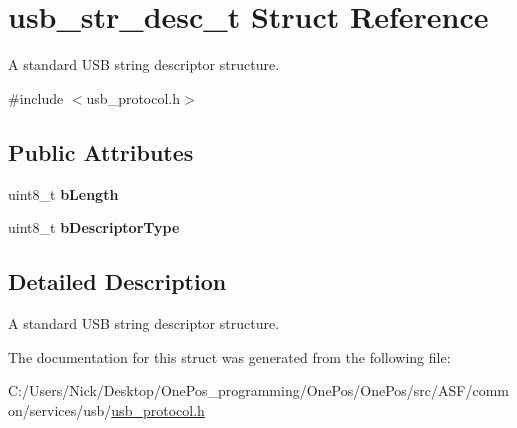 \hypertarget{structusb__str__desc__t}{\section{usb\-\_\-str\-\_\-desc\-\_\-t Struct Reference}
\label{structusb__str__desc__t}
}


A standard U\-S\-B string descriptor structure.  




{\ttfamily \#include $<$usb\-\_\-protocol.\-h$>$}

\subsection*{Public Attributes}
\begin{DoxyCompactItemize}
\item 
\hypertarget{structusb__str__desc__t_ab23ffbfabfea9cc57aec37cdb9122379}{uint8\-\_\-t {\bfseries b\-Length}}\label{structusb__str__desc__t_ab23ffbfabfea9cc57aec37cdb9122379}

\item 
\hypertarget{structusb__str__desc__t_afaeec55a399403b5d683d63ed7be6117}{uint8\-\_\-t {\bfseries b\-Descriptor\-Type}}\label{structusb__str__desc__t_afaeec55a399403b5d683d63ed7be6117}

\end{DoxyCompactItemize}


\subsection{Detailed Description}
A standard U\-S\-B string descriptor structure. 

The documentation for this struct was generated from the following file\-:\begin{DoxyCompactItemize}
\item 
C\-:/\-Users/\-Nick/\-Desktop/\-One\-Pos\-\_\-programming/\-One\-Pos/\-One\-Pos/src/\-A\-S\-F/common/services/usb/\hyperlink{usb__protocol_8h}{usb\-\_\-protocol.\-h}\end{DoxyCompactItemize}
